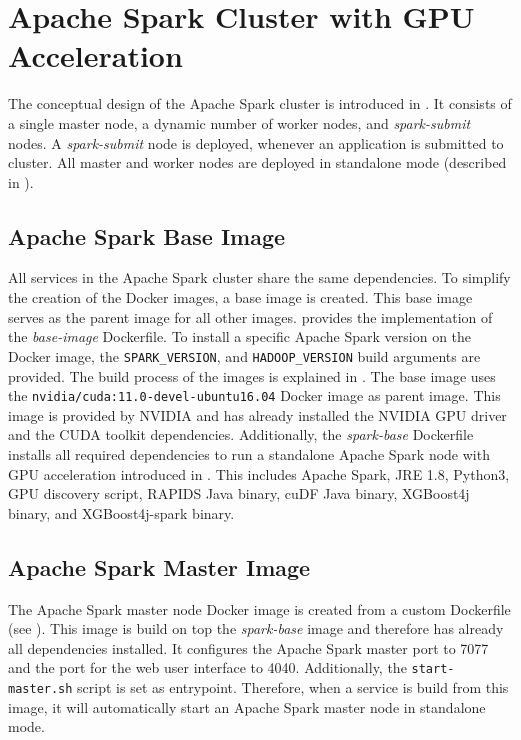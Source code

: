 \section{Apache Spark Cluster with GPU Acceleration}
\label{sec:07_spark}
The conceptual design of the Apache Spark cluster is introduced in . It consists of a single master node, a dynamic number of worker nodes, and \textit{spark-submit} nodes. A \textit{spark-submit} node is deployed, whenever an application is submitted to cluster.
All master and worker nodes are deployed in standalone mode (described in ).


\subsection{Apache Spark Base Image}
All services in the Apache Spark cluster share the same dependencies. To simplify the creation of the Docker images, a base image is created. This base image serves as the parent image for all other images.
%
 provides the implementation of the \textit{base-image} Dockerfile.
%
To install a specific Apache Spark version on the Docker image, the \texttt{SPARK\_VERSION}, and \texttt{HADOOP\_VERSION} build arguments are provided. The build process of the images is explained in .
%
The base image uses the \texttt{nvidia/cuda:11.0-devel-ubuntu16.04} Docker image as parent image. This image is provided by NVIDIA and has already installed the NVIDIA GPU driver and the CUDA toolkit dependencies.
%
Additionally, the \textit{spark-base} Dockerfile installs all required dependencies to run a standalone Apache Spark node with GPU acceleration introduced in . This includes Apache Spark, JRE 1.8, Python3, GPU discovery script, RAPIDS Java binary, cuDF Java binary, XGBoost4j binary, and XGBoost4j-spark binary.


\subsection{Apache Spark Master Image}
The Apache Spark master node Docker image is created from a custom Dockerfile (see ).
This image is build on top the \textit{spark-base} image and therefore has already all dependencies installed.
It configures the Apache Spark master port to 7077 and the port for the web user interface to 4040.
Additionally, the \texttt{start-master.sh} script is set as entrypoint. Therefore, when a service is build from this image, it will automatically start an Apache Spark master node in standalone mode.


